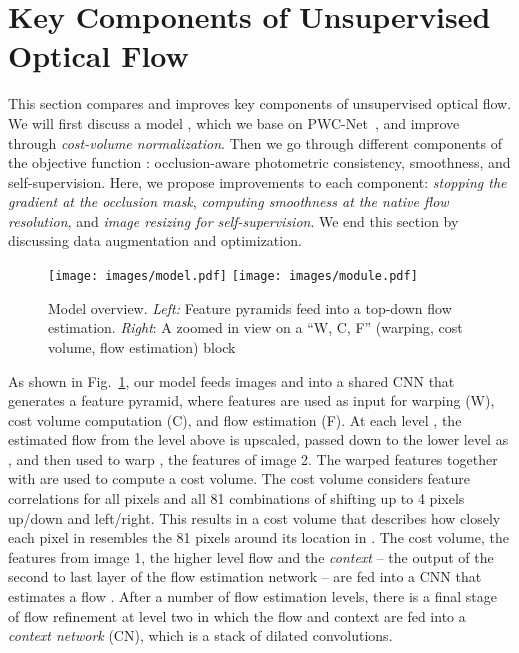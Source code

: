 \documentclass[runningheads]{llncs}
\begin{document}
\section{Key Components of Unsupervised Optical Flow}

This section compares and improves key components of unsupervised optical flow. We will first discuss a model , which we base on PWC-Net~\cite{Sun2018PWCNet}, and improve through \emph{cost-volume normalization}. Then we go through different components of the objective function : occlusion-aware photometric consistency, smoothness, and self-supervision. Here, we propose improvements to each component: \emph{stopping the gradient at the occlusion mask}, \emph{computing smoothness at the native flow resolution}, and \emph{image resizing for self-supervision}. We end this section by discussing data augmentation and optimization.


\begin{figure}[t]
    \centering
    \texttt{[image: images/model.pdf]}\hspace{0.1cm}
    \texttt{[image: images/module.pdf]}\caption{Model overview. \emph{Left:} Feature pyramids feed into a top-down flow estimation. \emph{Right}: A zoomed in view on a ``W, C, F'' (warping, cost volume, flow estimation) block}
    \label{fig:model}
\end{figure}

As shown in Fig.~\ref{fig:model}, our model feeds images  and  into a shared CNN that generates a feature pyramid, where features are used as input for warping (W), cost volume computation (C), and flow estimation (F). At each level , the estimated flow  from the level above is upscaled, passed down to the lower level as , and then used to warp , the features of image 2. The warped features  together with  are used to compute a cost volume.
The cost volume considers feature correlations for all pixels and all 81 combinations of shifting  up to 4 pixels up/down and left/right.
This results in a cost volume  that describes how closely each pixel in  resembles the 81 pixels around its location in .
The cost volume, the features from image 1, the higher level flow and the \emph{context} -- the output of the second to last layer of the flow estimation network -- are fed into a CNN that estimates a flow .
After a number of flow estimation levels, there is a final stage of flow refinement at level two in which the flow and context are fed into a \emph{context network} (CN), which is a stack of dilated convolutions.
\end{document}

